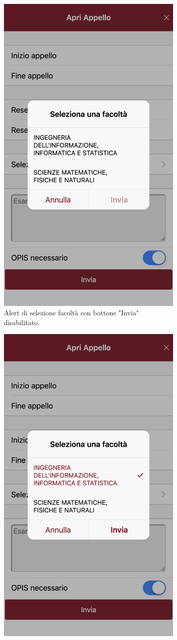 \documentclass[Lau, oneside, noexaminfo]{sapthesis}%
\begin{document}
\begin{figure}[H]
	\begin{subfigure}{0.6\textwidth}
	  \centering
	  \includegraphics[width=0.5\linewidth]{ui-iterations/iii/facolta-1}  
	  \caption{Alert di selezione facoltà con bottone "Invia" disabilitato.}
	\end{subfigure}
	\begin{subfigure}{0.6\textwidth}
	  \centering
	  \includegraphics[width=0.5\linewidth]{ui-iterations/iii/facolta-2}  

\end{subfigure}
\end{figure}
\end{document}
